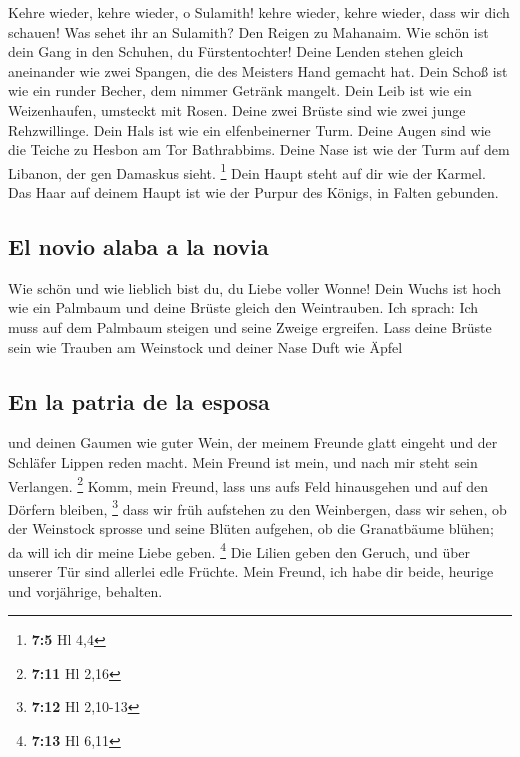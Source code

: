  Kehre wieder, kehre wieder, o Sulamith! kehre wieder,
kehre wieder, dass wir dich schauen! Was sehet ihr an Sulamith? Den
Reigen zu Mahanaim.  Wie schön ist dein Gang in den
Schuhen, du Fürstentochter! Deine Lenden stehen gleich aneinander wie
zwei Spangen, die des Meisters Hand gemacht hat.  Dein
Schoß ist wie ein runder Becher, dem nimmer Getränk mangelt. Dein Leib
ist wie ein Weizenhaufen, umsteckt mit Rosen.  Deine zwei
Brüste sind wie zwei junge Rehzwillinge.  Dein Hals ist
wie ein elfenbeinerner Turm. Deine Augen sind wie die Teiche zu Hesbon
am Tor Bathrabbims. Deine Nase ist wie der Turm auf dem Libanon, der gen
Damaskus sieht. \footnote{\textbf{7:5} Hl 4,4}  Dein Haupt
steht auf dir wie der Karmel. Das Haar auf deinem Haupt ist wie der
Purpur des Königs, in Falten gebunden.

\hypertarget{el-novio-alaba-a-la-novia}{%
\subsection{El novio alaba a la novia}\label{el-novio-alaba-a-la-novia}}

 Wie schön und wie lieblich bist du, du Liebe voller
Wonne!  Dein Wuchs ist hoch wie ein Palmbaum und deine
Brüste gleich den Weintrauben.  Ich sprach: Ich muss auf
dem Palmbaum steigen und seine Zweige ergreifen. Lass deine Brüste sein
wie Trauben am Weinstock und deiner Nase Duft wie Äpfel

\hypertarget{en-la-patria-de-la-esposa}{%
\subsection{En la patria de la esposa}\label{en-la-patria-de-la-esposa}}

 und deinen Gaumen wie guter Wein, der meinem Freunde
glatt eingeht und der Schläfer Lippen reden macht.  Mein
Freund ist mein, und nach mir steht sein Verlangen. \footnote{\textbf{7:11}
  Hl 2,16}  Komm, mein Freund, lass uns aufs Feld
hinausgehen und auf den Dörfern bleiben, \footnote{\textbf{7:12} Hl
  2,10-13}  dass wir früh aufstehen zu den Weinbergen,
dass wir sehen, ob der Weinstock sprosse und seine Blüten aufgehen, ob
die Granatbäume blühen; da will ich dir meine Liebe geben. \footnote{\textbf{7:13}
  Hl 6,11}  Die Lilien geben den Geruch, und über unserer
Tür sind allerlei edle Früchte. Mein Freund, ich habe dir beide, heurige
und vorjährige, behalten.

